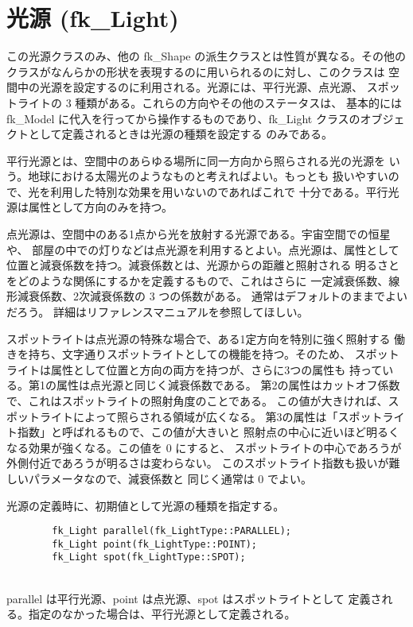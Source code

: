 \section{光源 (fk\_Light)}
この光源クラスのみ、他の fk\_Shape の派生クラスとは性質が異なる。その他の
クラスがなんらかの形状を表現するのに用いられるのに対し、このクラスは
空間中の光源を設定するのに利用される。光源には、平行光源、点光源、
スポットライトの 3 種類がある。これらの方向やその他のステータスは、
基本的には fk\_Model に代入を行ってから操作するものであり、fk\_Light
クラスのオブジェクトとして定義されるときは光源の種類を設定する
のみである。

平行光源とは、空間中のあらゆる場所に同一方向から照らされる光の光源を
いう。地球における太陽光のようなものと考えればよい。もっとも
扱いやすいので、光を利用した特別な効果を用いないのであればこれで
十分である。平行光源は属性として方向のみを持つ。

点光源は、空間中のある1点から光を放射する光源である。宇宙空間での恒星や、
部屋の中での灯りなどは点光源を利用するとよい。点光源は、属性として
位置と減衰係数を持つ。減衰係数とは、光源からの距離と照射される
明るさとをどのような関係にするかを定義するもので、これはさらに
一定減衰係数、線形減衰係数、2次減衰係数の 3 つの係数がある。
通常はデフォルトのままでよいだろう。
詳細はリファレンスマニュアルを参照してほしい。

スポットライトは点光源の特殊な場合で、ある1定方向を特別に強く照射する
働きを持ち、文字通りスポットライトとしての機能を持つ。そのため、
スポットライトは属性として位置と方向の両方を持つが、さらに3つの属性も
持っている。第1の属性は点光源と同じく減衰係数である。
第2の属性はカットオフ係数で、これはスポットライトの照射角度のことである。
この値が大きければ、スポットライトによって照らされる領域が広くなる。
第3の属性は「スポットライト指数」と呼ばれるもので、この値が大きいと
照射点の中心に近いほど明るくなる効果が強くなる。この値を 0 にすると、
スポットライトの中心であろうが外側付近であろうが明るさは変わらない。
このスポットライト指数も扱いが難しいパラメータなので、減衰係数と
同じく通常は 0 でよい。

光源の定義時に、初期値として光源の種類を指定する。
\\
\begin{screen}
\begin{verbatim}
        fk_Light parallel(fk_LightType::PARALLEL);
        fk_Light point(fk_LightType::POINT);
        fk_Light spot(fk_LightType::SPOT);
\end{verbatim}
\end{screen}
~ \\
parallel は平行光源、point は点光源、spot はスポットライトとして
定義される。指定のなかった場合は、平行光源として定義される。

